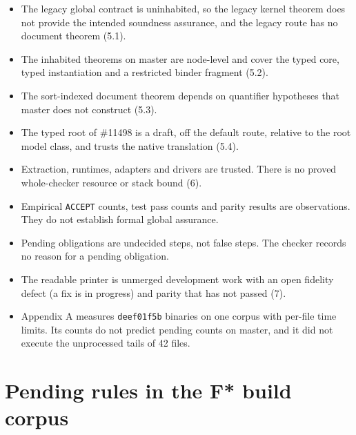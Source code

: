 \documentclass[10pt,a4paper]{article}
\begin{document}
\begin{itemize}\setlength{\itemsep}{1pt}\setlength{\parskip}{0pt}

\item The legacy global contract is uninhabited, so the legacy kernel theorem does not provide the intended soundness assurance, and the legacy route has no document theorem (5.1).

\item The inhabited theorems on master are node-level and cover the typed core, typed instantiation and a restricted binder fragment (5.2).

\item The sort-indexed document theorem depends on quantifier hypotheses that master does not construct (5.3).

\item The typed root of \#11498 is a draft, off the default route, relative to the root model class, and trusts the native translation (5.4).

\item Extraction, runtimes, adapters and drivers are trusted. There is no proved whole-checker resource or stack bound (6).

\item Empirical \texttt{ACCEPT} counts, test pass counts and parity results are observations. They do not establish formal global assurance.

\item Pending obligations are undecided steps, not false steps. The checker records no reason for a pending obligation.

\item The readable printer is unmerged development work with an open fidelity defect (a fix is in progress) and parity that has not passed (7).

\item Appendix A measures \texttt{deef01f5b} binaries on one corpus with per-file time limits. Its counts do not predict pending counts on master, and it did not execute the unprocessed tails of 42 files.

\end{itemize}

\appendix

\section{Pending rules in the F* build corpus}\label{sec:appendix-a-pending-rules-in-the-f-build-corpus}
\end{document}
